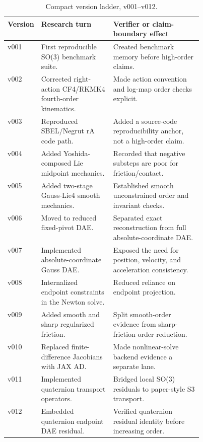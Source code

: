 \documentclass[10pt]{article}
\begin{document}
\begin{table}[H]
\centering
\caption{Compact version ladder, v001--v012.}
\label{tab:version_ladder_a}
\scriptsize
\begin{tabularx}{\linewidth}{p{0.08\linewidth}p{0.37\linewidth}Y}
\toprule
\textbf{Version} & \textbf{Research turn} & \textbf{Verifier or claim-boundary effect} \\
\midrule
v001 & First reproducible SO(3) benchmark suite. & Created benchmark memory before high-order claims. \\
v002 & Corrected right-action CF4/RKMK4 fourth-order kinematics. & Made action convention and log-map order checks explicit. \\
v003 & Reproduced SBEL/Negrut rA code path. & Added a source-code reproducibility anchor, not a high-order claim. \\
v004 & Added Yoshida-composed Lie midpoint mechanics. & Recorded that negative substeps are poor for friction/contact. \\
v005 & Added two-stage Gauss-Lie4 smooth mechanics. & Established smooth unconstrained order and invariant checks. \\
v006 & Moved to reduced fixed-pivot DAE. & Separated exact reconstruction from full absolute-coordinate DAE. \\
v007 & Implemented absolute-coordinate Gauss DAE. & Exposed the need for position, velocity, and acceleration consistency. \\
v008 & Internalized endpoint constraints in the Newton solve. & Reduced reliance on endpoint projection. \\
v009 & Added smooth and sharp regularized friction. & Split smooth-order evidence from sharp-friction order reduction. \\
v010 & Replaced finite-difference Jacobians with JAX AD. & Made nonlinear-solve backend evidence a separate lane. \\
v011 & Implemented quaternion transport operators. & Bridged local SO(3) residuals to paper-style S3 transport. \\
v012 & Embedded quaternion endpoint DAE residual. & Verified quaternion residual identity before increasing order. \\
\bottomrule
\end{tabularx}
\end{table}
\end{document}
